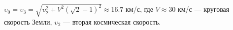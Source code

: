 $\upsilon_0=\upsilon_3=\sqrt{\upsilon^2_2+V^2(\sqrt{2}-1)^2}\approx16.7$ км/с, где $V\approx30$ км/с --- круговая скорость Земли,
$\upsilon_2$ --- вторая космическая скорость.